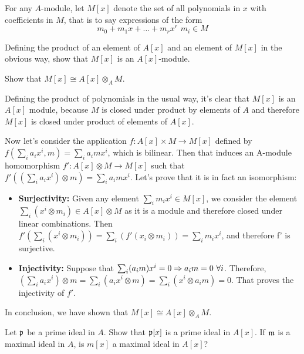 \begin{ex}
	For any $A$-module, let $M[x]$ denote the set of all polynomials in $x$ with coefficients in $M$, that is to say expressions of the form
	\[
		m_0 + m_1 x + \dots + m_r x^r \, \, m_i \in M
	\]

	Defining the product of an element of $A[x]$ and an element of $M[x]$ in the obvious way, show that $M[x]$ is an $A[x]$-module.

	Show that $M[x] \cong A[x] \otimes_A M$.
\end{ex}

\begin{sol}
	Defining the product of polynomials in the usual way, it's clear that $M[x]$ is an $A[x]$ module, because $M$ is closed under product by elements of $A$ and therefore $M[x]$ is closed under product of elements of $A[x]$.

	Now let's consider the application $f: A[x] \times M \to M[x]$ defined by $f(\sum_i a_i x^i, m) = \sum_i a_i m x^i$, which is bilinear. Then that induces an A-module homomorphism $f': A[x] \otimes M \to M[x]$ such that $f'((\sum_i a_i x^i) \otimes m) = \sum_i a_i m x^i$. Let's prove that it is in fact an isomorphism:
	\begin{itemize}
		\item \textbf{Surjectivity:} Given any element $\sum_i m_i x^i \in M[x]$, we consider the element $\sum_i (x^i \otimes m_i) \in A[x] \otimes M$ as it is a module and therefore closed under linear combinations. Then $f'(\sum_i (x^i \otimes m_i)) = \sum_i (f'(x_i \otimes m_i)) = \sum_i m_i x^i$, and therefore f' is surjective.

		\item \textbf{Injectivity:} Suppose that $\sum_i (a_i m)x^i = 0 \Rightarrow a_i m = 0 \, \, \forall i$. Therefore, $(\sum_i a_i x^i) \otimes m = \sum_i (a_i x^i \otimes m) = \sum_i (x^i \otimes a_i m) = 0$. That proves the injectivity of $f'$.
	\end{itemize}

	In conclusion, we have shown that $M[x] \cong A[x] \otimes_A M$.
\end{sol}

\begin{ex}
	Let $\mathfrak{p}$ be a prime ideal in $A$. Show that $\mathfrak{p}[x]$ is a prime ideal in $A[x]$. If $\mathfrak{m}$ is a maximal ideal in $A$, is $m[x]$ a maximal ideal in $A[x]$?
\end{ex}

